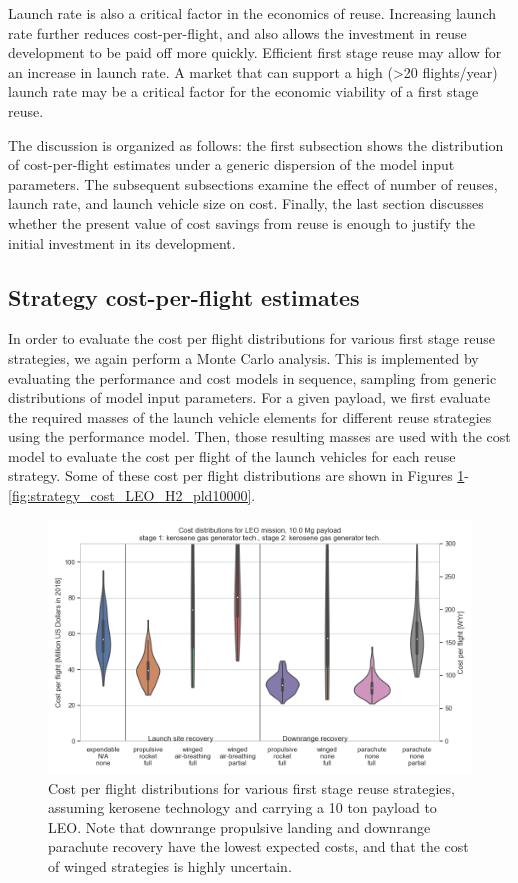 \documentclass[conf]{new-aiaa}
\begin{document}
\begin{multicols}{2}
Launch rate is also a critical factor in the economics of reuse. Increasing launch rate further reduces cost-per-flight, and also allows the investment in reuse development to be paid off more quickly. Efficient first stage reuse may allow for an increase in launch rate. A market that can support a high (>20 flights/year) launch rate may be a critical factor for the economic viability of a first stage reuse.

The discussion is organized as follows: the first subsection shows the distribution of cost-per-flight estimates under a generic dispersion of the model input parameters. The subsequent subsections examine the effect of number of reuses, launch rate, and launch vehicle size on cost. Finally, the last section discusses whether the present value of cost savings from reuse is enough to justify the initial investment in its development.

\subsection{Strategy cost-per-flight estimates}

In order to evaluate the cost per flight distributions for various first stage reuse strategies, we again perform a Monte Carlo analysis. This is implemented by evaluating the performance and cost models in sequence, sampling from generic distributions of model input parameters. For a given payload, we first evaluate the required masses of the launch vehicle elements for different reuse strategies using the performance model. Then, those resulting masses are used with the cost model to evaluate the cost per flight of the launch vehicles for each reuse strategy. Some of these cost per flight distributions are shown in Figures \ref{fig:strategy_cost_LEO_kerosene_pld10000}- \ref{fig:strategy_cost_LEO_H2_pld10000}. 

\begin{figure}
    \centering
    \includegraphics[width=\textwidth]{../../lvreuse/analysis/combined/plots/strategy_cost_LEO_kerosene_pld10000}
    \caption{\label{fig:strategy_cost_LEO_kerosene_pld10000} Cost per flight distributions for various first stage reuse strategies, assuming kerosene technology and carrying a 10 ton payload to LEO. Note that downrange propulsive landing and downrange parachute recovery have the lowest expected costs, and that the cost of winged strategies is highly uncertain.}
\end{figure}


\end{multicols}
\end{document}
